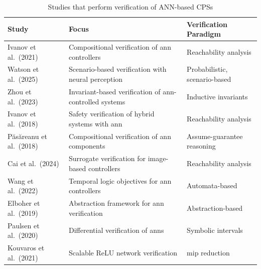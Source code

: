 \begin{table}[htbp]
  \centering
  \caption{Studies that perform verification of ANN-based CPSs}
  \label{tab:included-studies-short}
  \begin{tabular}{|p{4cm}|p{6cm}|p{4cm}|}
  \hline
  \textbf{Study} & \textbf{Focus} & \textbf{Verification Paradigm} \\ \hline
  
 Ivanov et al.\ (2021) \cite{ivanov_compositional_2021} & Compositional verification of \gls{ann} controllers & Reachability analysis \\ \hline
  
 Watson et al.\ (2025) \cite{Watson2025Scenario} & Scenario-based verification with neural perception & Probabilistic, scenario-based \\ \hline

 Zhou et al.\ (2023) \cite{Zhou2023Compositional} & Invariant-based verification of \gls{ann}-controlled systems & Inductive invariants \\ \hline
  
 Ivanov et al.\ (2018) \cite{Ivanov2019Verisig} & Safety verification of hybrid systems with \gls{ann} & Reachability analysis \\ \hline
  
 P\u{a}s\u{a}reanu et al.\ (2018) \cite{pasareanu_compositional_2018} & Compositional verification of \gls{ann} components & Assume-guarantee reasoning \\ \hline
  
 Cai et al.\ (2024) \cite{Cai2024Scalable} & Surrogate verification for image-based controllers & Reachability analysis \\ \hline
  
 Wang et al.\ (2022) \cite{Wang2022Verified} & Temporal logic objectives for \gls{ann} controllers & Automata-based \\ \hline
  
 Elboher et al.\ (2019) \cite{Elboher2020Abstraction} & Abstraction framework for \gls{ann} verification & Abstraction-based \\ \hline
  
 Paulsen et al.\ (2020) \cite{Paulsen2020ReluDiff} & Differential verification of \gls{ann}s & Symbolic intervals \\ \hline
  
 Kouvaros et al.\ (2021) \cite{Kouvaros2021Towards} & Scalable ReLU network verification & \gls{mip} reduction \\ \hline
  
  \end{tabular}
  \end{table}

